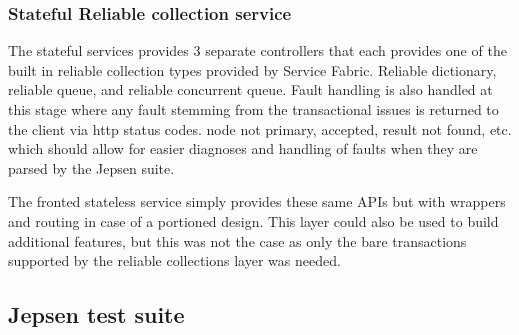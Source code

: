 \documentclass[a4paper,10pt,titlepage]{report}
\begin{document}
    \subsubsection{Stateful Reliable collection service}

    The stateful services provides 3 separate controllers that each provides one of the built in reliable collection types provided by Service Fabric. Reliable dictionary, reliable queue, and reliable concurrent queue. Fault handling is also handled at this stage where any fault stemming from the transactional issues is returned to the client via http status codes\cite{wikihttpstatuscodes}. node not primary, accepted, result not found, etc. which should allow for easier diagnoses and handling of faults when they are parsed by the Jepsen suite.

    The fronted stateless service simply provides these same APIs but with wrappers and routing in case of a portioned design. This layer could also be used to build additional features, but this was not the case as only the bare transactions supported by the reliable collections layer was needed.

    \subsection{Jepsen test suite}
    
\end{document}
